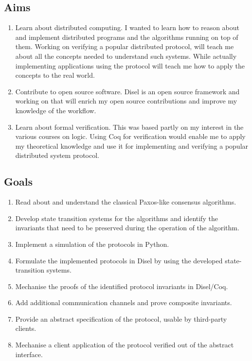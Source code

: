 \subsection{Aims}
\begin{enumerate}
\itemsep0em
  \item Learn about distributed computing. I wanted to learn how to reason about
    and implement distributed programs and the algorithms running on top of them.
    Working on verifying a popular distributed protocol, will teach me about all
    the concepts needed to understand such systems. While actually implementing
    applications using the protocol will teach me how to apply the concepts to
    the real world.
  \item Contribute to open source software. Disel is an open source framework
    and working on that will enrich my open source contributions and improve
    my knowledge of the workflow.
  \item Learn about formal verification. This was based partly on my interest in
    the various courses on logic. Using Coq for verification would enable me
    to apply my theoretical knowledge and use it for
    implementing and verifying a popular distributed system protocol.

\end{enumerate}

\vspace{-5mm}
\subsection{Goals}
\begin{enumerate}
\itemsep0em
  \item Read about and understand the classical Paxos-like consensus algorithms.
  \item Develop state transition systems for the algorithms and identify the invariants that need to be preserved during the operation of the algorithm.
  \item Implement a simulation of the protocols in Python.
  \item Formulate the implemented protocols in Disel by using the developed state-transition systems.
  \item Mechanise the proofs of the identified protocol invariants in Disel/Coq.
  \item Add additional communication channels and prove composite invariants.
  \item Provide an abstract specification of the protocol, usable by third-party clients.
  \item Mechanise a client application of the protocol verified out of the abstract interface.
\end{enumerate}

